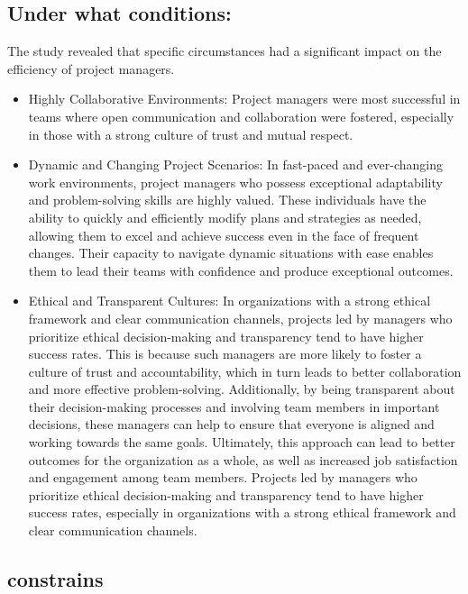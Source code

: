 \documentclass{article}
\begin{document}
\subsection{Under what conditions:}
The study revealed that specific circumstances had a significant impact on the efficiency of project managers.
\begin{itemize}
    \item Highly Collaborative Environments: Project managers were most successful in teams where open communication and collaboration were fostered, especially in those with a strong culture of trust and mutual respect.
    \item Dynamic and Changing Project Scenarios: In fast-paced and ever-changing work environments, project managers who possess exceptional adaptability and problem-solving skills are highly valued. These individuals have the ability to quickly and efficiently modify plans and strategies as needed, allowing them to excel and achieve success even in the face of frequent changes. Their capacity to navigate dynamic situations with ease enables them to lead their teams with confidence and produce exceptional outcomes\cite{relationship_between_project_manage}.
    \item Ethical and Transparent Cultures: In organizations with a strong ethical framework and clear communication channels, projects led by managers who prioritize ethical decision-making and transparency tend to have higher success rates. This is because such managers are more likely to foster a culture of trust and accountability, which in turn leads to better collaboration and more effective problem-solving. Additionally, by being transparent about their decision-making processes and involving team members in important decisions, these managers can help to ensure that everyone is aligned and working towards the same goals. Ultimately, this approach can lead to better outcomes for the organization as a whole, as well as increased job satisfaction and engagement among team members. Projects led by managers who prioritize ethical decision-making and transparency tend to have higher success rates, especially in organizations with a strong ethical framework and clear communication channels\cite{Project_Management_Techniques}.
\end{itemize}

\subsection{constrains}
\end{document}
